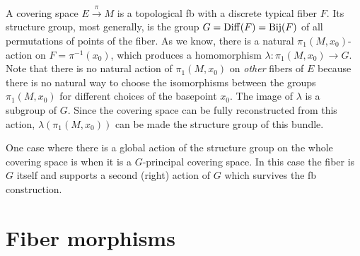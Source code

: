 \begin{example}
    A covering space $E\overset{\pi}{\to} M$ is a topological \gls{fb} with a discrete typical fiber $F$. Its structure group, most generally, is the group $G=\operatorname{Diff}(F)=\mathrm{Bij}(F)$ of all permutations of points of the fiber. As we know, there is a natural $\pi_1(M,x_0)$-action on $F=\pi^{-1}(x_0)$, which produces a homomorphism $\lambda:\pi_1(M,x_0)\to G$. Note that there is no natural action of $\pi_1(M,x_0)$ on \emph{other} fibers of $E$ because there is no natural way to choose the isomorphisms between the groups $\pi_1(M,x_0)$ for different choices of the basepoint $x_0$. The image of $\lambda$ is a subgroup of $G$. Since the covering space can be fully reconstructed from this action, $\lambda(\pi_1(M,x_0))$ can be made the structure group of this bundle. 
    
    One case where there is a global action of the structure group on the whole covering space is when it is a $G$-principal covering space. In this case the fiber is $G$ itself and supports a second (right) action of $G$ which survives the \gls{fb} construction.
\end{example}






\section{Fiber morphisms}\label{sec: fiber morphisms}

